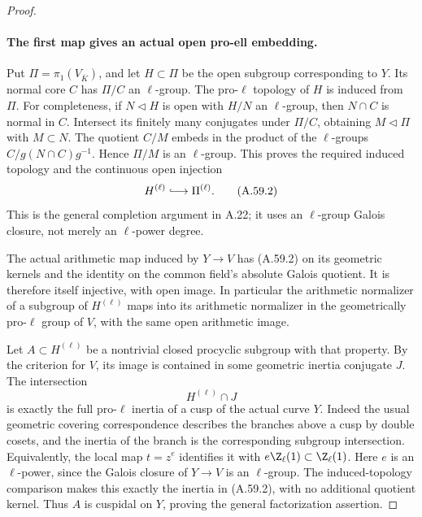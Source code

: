 \begin{proof}
\paragraph{The first map gives an actual open pro-ell embedding.}
Put \(\Pi=\pi_1(V_{\overline K})\), and let
\(H\subset\Pi\) be the open subgroup corresponding to
\(Y\). Its normal core \(C\) has \(\Pi/C\) an
\(\ell\)-group. The pro-\(\ell\) topology of \(H\)
is induced from \(\Pi\). For completeness, if
\(N\triangleleft H\) is open with \(H/N\) an
\(\ell\)-group, then \(N\cap C\) is normal in
\(C\). Intersect its finitely many conjugates under
\(\Pi/C\), obtaining \(M\triangleleft\Pi\) with
\(M\subset N\). The quotient \(C/M\) embeds in the
product of the \(\ell\)-groups
\(C/g(N\cap C)g^{-1}\). Hence \(\Pi/M\) is an
\(\ell\)-group. This proves the required induced topology
and the continuous open injection
\[
               H^{(\ell)}\lhook\joinrel\longrightarrow
                                  \Pi^{(\ell)}.       \tag{A.59.2}
\]
This is the general completion argument in A.22; it uses
an \(\ell\)-group Galois closure, not merely an
\(\ell\)-power degree.

The actual arithmetic map induced by \(Y\to V\)
has (A.59.2) on its geometric kernels and the identity
on the common field's absolute Galois quotient. It is
therefore itself injective, with open image. In particular
the arithmetic normalizer of a subgroup of \(H^{(\ell)}\)
maps into its arithmetic normalizer in the geometrically
pro-\(\ell\) group of \(V\), with the same open
arithmetic image.

Let \(A\subset H^{(\ell)}\) be a nontrivial closed
procyclic subgroup with that property. By the criterion
for \(V\), its image is contained in some geometric
inertia conjugate \(J\). The intersection
\[
                         H^{(\ell)}\cap J             \tag{A.59.3}
\]
is exactly the full pro-\(\ell\) inertia of a cusp
of the actual curve \(Y\). Indeed the usual geometric
covering correspondence describes the branches above a
cusp by double cosets, and the inertia of the branch
is the corresponding subgroup intersection. Equivalently,
the local map \(t=z^e\) identifies it with
\(e\Z_\ell(1)\subset\Z_\ell(1)\).
Here \(e\) is an \(\ell\)-power, since the Galois
closure of \(Y\to V\) is an \(\ell\)-group. The
induced-topology comparison makes this exactly the
inertia in (A.59.2), with no additional quotient kernel.
Thus \(A\) is cuspidal on \(Y\), proving the general
factorization assertion.


\end{proof}

